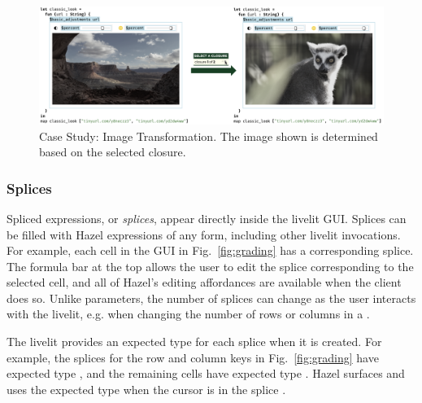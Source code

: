 \begin{figure}
  \begin{center}
    \includegraphics[width=40pc]{img-filter.png}
  \end{center}
  \caption{Case Study: Image Transformation. The image shown is determined based on the selected closure.}
  \label{fig:img-transformation}
\end{figure}


\subsubsection{Splices}\label{sec:splices}
Spliced expressions, or \emph{splices}, appear directly inside the livelit GUI.
Splices can be filled with Hazel expressions of any form, including other livelit invocations.
For example, each cell in the  GUI in Fig.~\ref{fig:grading}
has a corresponding splice. The formula bar at the top
allows the user to edit the splice corresponding to the selected cell,
and all of Hazel's editing affordances are available when the client does so.
Unlike parameters, the number of splices can change
as the user interacts with the livelit, e.g. when changing the number of rows or columns in a .

The livelit provides an expected type for each splice when it is created.
For example, the splices for the row and column keys in Fig.~\ref{fig:grading} have expected type ,
and the remaining cells have expected type .
Hazel surfaces and uses the expected type when the cursor is in the splice \cite{hazeltutor}.

